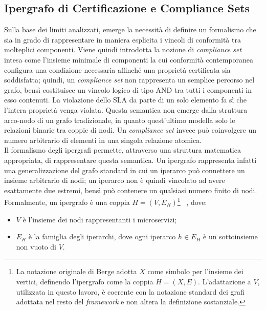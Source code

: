 \subsection{Ipergrafo di Certificazione e Compliance Sets}
\label{sec:ipergrafo_certificazione}

Sulla base dei limiti analizzati, emerge la necessità di definire un formalismo che sia in grado di
rappresentare in maniera esplicita i vincoli di conformità tra molteplici componenti. Viene quindi
introdotta la nozione di \textit{compliance set} intesa come l'insieme minimale di componenti la cui
conformità contemporanea configura una condizione necessaria affinché una proprietà certificata sia
soddisfatta; quindi, un \textit{compliance set} non rappresenta un semplice percorso nel grafo,
bensì costituisce un vincolo logico di tipo AND tra tutti i componenti in esso contenuti. La
violazione dello \gls{SLA} da parte di un solo elemento fa sì che l'intera proprietà venga violata.
Questa semantica non emerge dalla struttura arco-nodo di un grafo tradizionale, in quanto
quest'ultimo modella solo le relazioni binarie tra coppie di nodi. Un \textit{compliance set}
invece può coinvolgere un numero arbitrario di elementi in una singola relazione atomica. \\
Il formalismo degli ipergrafi permette, attraverso una struttura matematica appropriata, di
rappresentare questa semantica. Un ipergrafo rappresenta infatti una generalizzazione del grafo
standard in cui un iperarco può connettere un insieme arbitrario di nodi; un iperarco non è quindi
vincolato ad avere esattamente due estremi, bensì può contenere un qualsiasi numero finito di nodi.
Formalmente, un ipergrafo è una coppia $H = (V, E_H)$\footnote{La notazione
originale di Berge adotta $X$ come simbolo per l'insieme dei vertici, definendo l'ipergrafo come
la coppia $H = (X, E)$. L'adattazione a $V$, utilizzata in questo lavoro, è coerente con la
notazione standard dei grafi adottata nel resto del \textit{framework} e non altera la definizione
sostanziale.} ~\cite{berge1989}, dove:

\begin{itemize}
  \item $V$ è l'insieme dei nodi rappresentanti i microservizi;
  \item $E_H$ è la famiglia degli iperarchi, dove ogni iperarco $h \in E_H$ è un sottoinsieme non
        vuoto di $V$.
\end{itemize}

